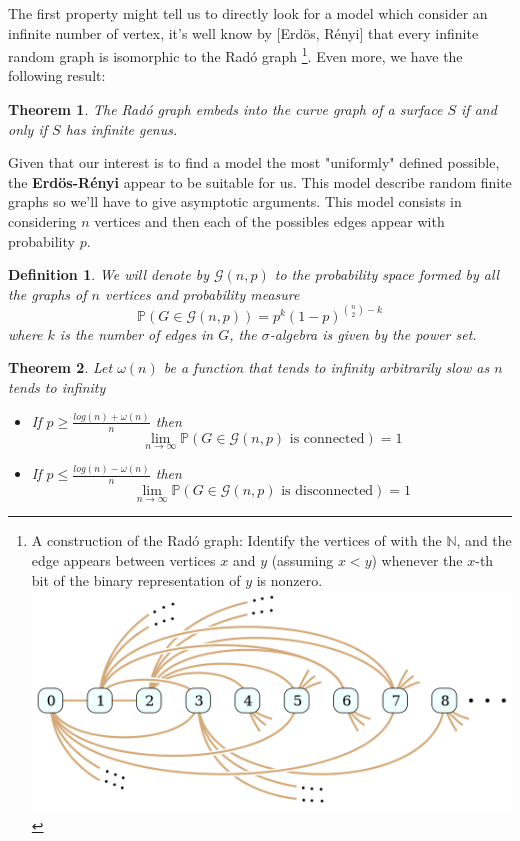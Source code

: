 \documentclass[a4paper]{tufte-handout}
\newcommand{\N}{\mathbb{N}}
\renewcommand{\G}{\mathcal{G}}
\renewcommand{\P}{\mathbb{P}}
\newtheorem{theorem}{Theorem}[section]
\newtheorem{defini}{Definition}[theorem]
\begin{document}
The first property might tell us to directly look for a model which consider an infinite number of vertex, it's well know by [Erdös, Rényi]\cite{RadoUnique} that every infinite random graph is isomorphic to the Radó graph \footnote{A construction of the Radó graph: Identify the vertices of with the $\N$, and the edge appears between vertices $x$ and $y$ (assuming $x < y$) whenever the $x$-th bit of the binary representation of $y$ is nonzero.
\includegraphics[scale=0.11]{figures/rado_graph.png}}. Even more, we have the following result:

\begin{theorem}
The Radó graph embeds into the curve graph of a surface $S$ if and only if $S$ has infinite genus.
\end{theorem}


Given that our interest is to find a model the most "uniformly" defined possible, the \textbf{Erdös-Rényi} appear to be suitable for us. This model describe random finite graphs so we'll have to give asymptotic arguments. This model consists in considering $n$ vertices and then each of the possibles edges appear with probability $p$. 

\begin{defini}
We will denote by $\G(n,p)$ to the probability space formed by all the graphs of $n$ vertices and probability measure 
$$ \P(G\in \G(n,p)) = p^{k} (1-p)^{\binom{n}{2}-k} $$
where $k$ is the number of edges in $G$, the $\sigma$-algebra is given by the power set.
\end{defini}

\begin{theorem}
Let $\omega(n)$ be a function that tends to infinity arbitrarily slow as $n$ tends to infinity
\begin{itemize}
\item If $p\geq \frac{log(n)+ \omega(n)}{n}$ then 
$$\lim_{n \to \infty} \P(G \in \G(n,p) \text{ is connected}) = 1$$
\item If $p\leq \frac{log(n)- \omega(n)}{n}$ then
$$\lim_{n \to \infty} \P(G \in \G(n,p) \text{ is disconnected}) = 1$$
\end{itemize}
\end{theorem}
\end{document}
